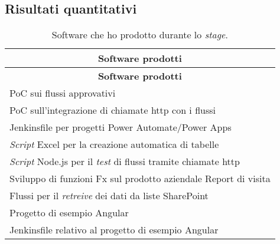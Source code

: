 \subsection{Risultati quantitativi}
\begingroup
\renewcommand\arraystretch{1.3}
\begin{longtable}{|p{11cm}|}
    \caption{Software che ho prodotto durante lo \emph{stage}.}
    \label{tab:risultatiQuantitativi}\\
    \hline \multicolumn{1}{|c|}{\textbf{Software prodotti}}\\ \hline \endfirsthead
    \hline \multicolumn{1}{|c|}{\textbf{Software prodotti}}\\ \hline \endhead
    \hline \endfoot
    \hline \endlastfoot
    \hline PoC sui flussi approvativi\\
    \hline PoC sull'integrazione di chiamate \gls{http} con i flussi\\
    \hline Jenkinsfile per progetti Power Automate/Power Apps\\
    \hline \emph{Script} Excel per la creazione automatica di tabelle\\
    \hline \emph{Script} Node.js per il \emph{test} di flussi tramite chiamate \gls{http}\\
    \hline Sviluppo di funzioni Fx sul prodotto aziendale Report di visita\\
    \hline Flussi per il \emph{retreive} dei dati da liste SharePoint\\
    \hline Progetto di esempio Angular\\
    \hline Jenkinsfile relativo al progetto di esempio Angular\\
\end{longtable}
\endgroup